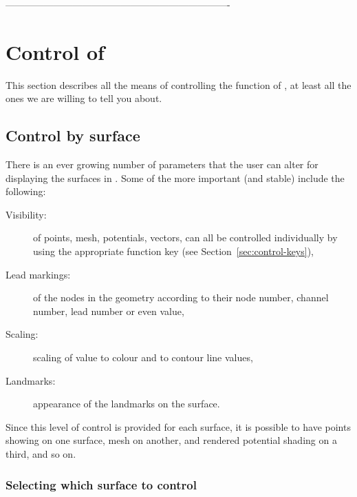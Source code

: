 ----------------------------------------------------------------------

\section{Control of \map{}}
\label{sec:control}

This section describes all the means of controlling the function of \map{},
at least all the ones we are willing to tell you about.



\subsection{Control by surface}

There is an ever growing number of parameters that the user can alter
for displaying the surfaces in \map{}.  Some of the more important (and
stable) include the following:

\begin{description}
  \item [Visibility:] of points, mesh, potentials, vectors, \etc{} can all
        be controlled individually by using the appropriate function key
        (see Section~\ref{sec:control-keys}), 
  \item [Lead markings: ] of the nodes in the geometry according to their
        node number, channel number, lead number or even value,
  \item [Scaling: ] scaling of value to colour and to contour line values,
  \item [Landmarks: ] appearance of the landmarks on the surface.
\end{description}

Since this level of control is provided for each surface, it is possible to
have points showing on one surface, mesh on another, and rendered potential
shading on a third, and so on. 

\subsubsection{Selecting which surface to control} 

